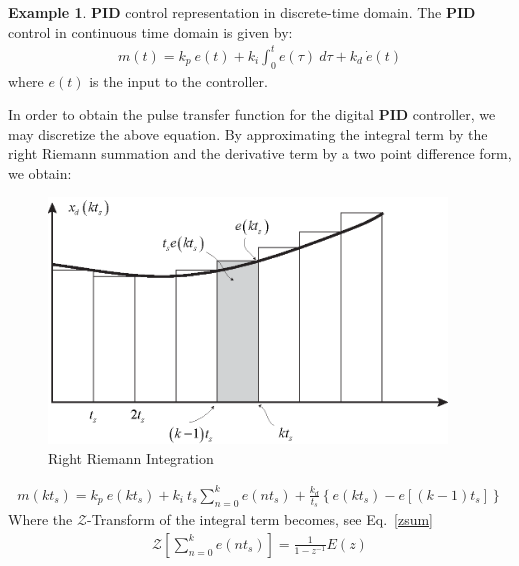 \documentclass[11pt,a4paper,oneside]{book}
\numberwithin{equation}{section}
\theoremstyle{it}
\theoremstyle{definition}
\newtheorem{example}{Example}[chapter]
\begin{document}
\begin{example}\label{PIDinDTD}
\textbf{PID} control representation in discrete-time domain. The \textbf{PID} 
control in 
continuous time domain is given by:
\begin{equation}
	\begin{split}
		m(t) = k_p \ e(t) + k_i \int_{0}^{t} e(\tau)\ d\tau +k_d \ \dot{e}(t)
	\end{split}
\end{equation}
where $e(t)$ is the input to the controller.

In order to obtain the pulse transfer function for the digital \textbf{PID} 
controller, we may discretize the above equation. By approximating the integral 
term by the right Riemann summation and the derivative term by a two point 
difference form, we obtain:
\begin{figure}[H]
	\centering
	\includegraphics[width = 300pt, keepaspectratio]{figures/discretization/integration.eps}
		\captionsetup{width=0.5\textwidth, font=small}		
		\caption{Right Riemann Integration}
	\label{figure_discretization_2}
\end{figure}
\begin{equation}
	\begin{split}
		m(kt_s) = k_p \ e(kt_s) + k_i \ t_s \sum_{n=0}^{k} e(nt_s) + \frac{k_d}{t_s} \left\lbrace e(kt_s) - e\left[ (k-1)t_s\right] \right\rbrace  
	\end{split}
\end{equation}
Where the $\mathcal{Z}$-Transform of the integral term becomes, see Eq.~\eqref{zsum}
\begin{equation}
	\begin{split}
		\mathcal{Z}\left[\sum_{n=0}^{k} e(nt_s) \right] = \frac{1}{1-z^{-1}}E(z) 
	\end{split}
\end{equation}
\begin{mybox}

\end{mybox}
\end{example}
\end{document}
